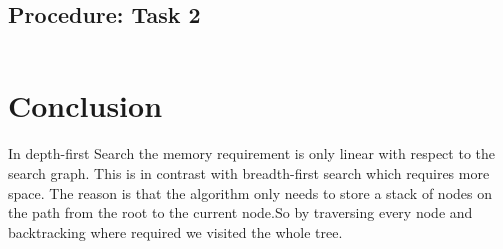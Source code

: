 \documentclass[11pt]{article}            %
\begin{document}
\subsection{Procedure: Task 2 }     

\begin{lstlisting}[language=Python]


\end{lstlisting}

\section{Conclusion}  
In depth-first Search the memory requirement is only linear with respect to the search graph. This is in contrast with breadth-first search which requires more space. The reason is that the algorithm only needs to store a stack of nodes on the path from the root to the current node.So by traversing every node and backtracking where required we visited the whole tree.

 
\end{document}
